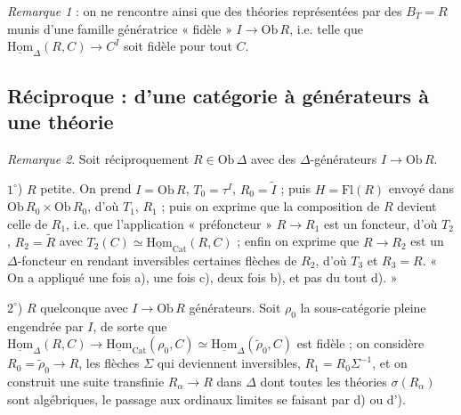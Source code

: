 \documentclass[11pt,a4paper]{article}
\begin{document}
\emph{Remarque 1} : on ne rencontre ainsi que des théories représentées par
des $B_{T} = R$ munis d'une famille génératrice « fidèle » $I \to \mathrm{Ob}
\,R$, i.e. telle que $\underline{\mathrm{Hom}}_{\Delta}(R, C) \to C^{I}$ soit
fidèle pour tout $C$.

\subsection*{Réciproque : d'une catégorie à générateurs à une théorie}

\emph{Remarque 2}. Soit réciproquement $R \in \mathrm{Ob}\,\Delta$ avec des
$\Delta$-générateurs $I \to \mathrm{Ob}\,R$.

$1^{\circ}$) $R$ petite. On prend $I = \mathrm{Ob}\,R$, $T_{0} = \tau^{I}$,
$R_{0} = \widetilde{I}$ ; puis $H = \mathrm{Fl}(R)$ envoyé dans $\mathrm{Ob}\,
R_{0} \times \mathrm{Ob}\,R_{0}$, d'où $T_{1}$, $R_{1}$ ; puis on exprime que
la composition de $R$ devient celle de $R_{1}$, i.e. que l'application
« préfoncteur » $R \to R_{1}$ est un foncteur, d'où $T_{2}$, $R_{2} =
\widetilde{R}$ avec $T_{2}(C) \simeq \underline{\mathrm{Hom}}_{\mathrm{Cat}}
(R, C)$ ; enfin on exprime que $R \to R_{2}$ est un $\Delta$-foncteur en
rendant inversibles certaines flèches de $R_{2}$, d'où $T_{3}$ et $R_{3} =
R$. « On a appliqué une fois a), une fois c), deux fois b), et pas du tout
d). »

$2^{\circ}$) $R$ quelconque avec $I \to \mathrm{Ob}\,R$ générateurs. Soit
$\rho_{0}$ la sous-catégorie pleine engendrée par $I$, de sorte que
$\underline{\mathrm{Hom}}_{\Delta}(R, C) \to \underline{\mathrm{Hom}}_{\mathrm{Cat}}
(\rho_{0}, C) \simeq \underline{\mathrm{Hom}}_{\Delta}(\tilde\rho_{0}, C)$ est
fidèle ; on considère $R_{0} = \tilde\rho_{0} \to R$, les flèches $\Sigma$
qui deviennent inversibles, $R_{1} = R_{0}\Sigma^{-1}$, et on construit une
suite transfinie $R_{\alpha} \to R$ dans $\Delta$ dont toutes les théories
$\sigma(R_{\alpha})$ sont algébriques, le passage aux ordinaux limites se
faisant par d) ou d').
\end{document}
